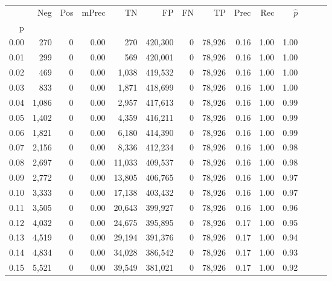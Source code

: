 \begin{tabular}{rrrrrrrrrrrrrr}
\toprule
{} &    Neg &    Pos & mPrec &       TN &       FP &      FN &      TP &  Prec &   Rec & $\hat{p}$ \\
p    &        &        &       &          &          &         &         &       &       &           \\
\midrule
0.00 &    270 &      0 &  0.00 &      270 &  420,300 &       0 &  78,926 &  0.16 &  1.00 &      1.00 \\
0.01 &    299 &      0 &  0.00 &      569 &  420,001 &       0 &  78,926 &  0.16 &  1.00 &      1.00 \\
0.02 &    469 &      0 &  0.00 &    1,038 &  419,532 &       0 &  78,926 &  0.16 &  1.00 &      1.00 \\
0.03 &    833 &      0 &  0.00 &    1,871 &  418,699 &       0 &  78,926 &  0.16 &  1.00 &      1.00 \\
0.04 &  1,086 &      0 &  0.00 &    2,957 &  417,613 &       0 &  78,926 &  0.16 &  1.00 &      0.99 \\
0.05 &  1,402 &      0 &  0.00 &    4,359 &  416,211 &       0 &  78,926 &  0.16 &  1.00 &      0.99 \\
0.06 &  1,821 &      0 &  0.00 &    6,180 &  414,390 &       0 &  78,926 &  0.16 &  1.00 &      0.99 \\
0.07 &  2,156 &      0 &  0.00 &    8,336 &  412,234 &       0 &  78,926 &  0.16 &  1.00 &      0.98 \\
0.08 &  2,697 &      0 &  0.00 &   11,033 &  409,537 &       0 &  78,926 &  0.16 &  1.00 &      0.98 \\
0.09 &  2,772 &      0 &  0.00 &   13,805 &  406,765 &       0 &  78,926 &  0.16 &  1.00 &      0.97 \\
0.10 &  3,333 &      0 &  0.00 &   17,138 &  403,432 &       0 &  78,926 &  0.16 &  1.00 &      0.97 \\
0.11 &  3,505 &      0 &  0.00 &   20,643 &  399,927 &       0 &  78,926 &  0.16 &  1.00 &      0.96 \\
0.12 &  4,032 &      0 &  0.00 &   24,675 &  395,895 &       0 &  78,926 &  0.17 &  1.00 &      0.95 \\
0.13 &  4,519 &      0 &  0.00 &   29,194 &  391,376 &       0 &  78,926 &  0.17 &  1.00 &      0.94 \\
0.14 &  4,834 &      0 &  0.00 &   34,028 &  386,542 &       0 &  78,926 &  0.17 &  1.00 &      0.93 \\
0.15 &  5,521 &      0 &  0.00 &   39,549 &  381,021 &       0 &  78,926 &  0.17 &  1.00 &      0.92 \\

\end{tabular}
